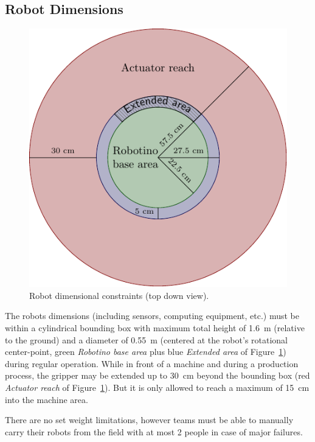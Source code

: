 \documentclass[12pt,twoside]{article}
\newcommand{\reffig}[1]{Figure~\ref{#1}}
\begin{document}
\subsection{Robot Dimensions}
\begin{figure}
  \includegraphics{figures/dimensions.pdf}
  \caption{Robot dimensional constraints (top down view).}
  \label{fig:dimensions}
\end{figure}

The robots dimensions (including sensors, computing equipment, etc.) must be
within a cylindrical bounding box with maximum total height of \SI{1.6}{\metre}
(relative to the ground) and a diameter of
\SI{0.55}{\metre} (centered at the robot's rotational
center-point, green \emph{Robotino base area} plus blue \emph{Extended area} of
\reffig{fig:dimensions}) during regular operation.
While  in front of a machine and during a production process, the gripper may
be extended up to \SI{30}{\centi\metre} beyond the bounding box
(red \emph{Actuator reach} of \reffig{fig:dimensions}).
But it is only allowed to reach a maximum of
\SI{15}{\centi\metre} into the machine area.

There are no set weight limitations, however teams must be able to manually
carry their robots from the field with at most 2 people in case of major
failures.
\end{document}
